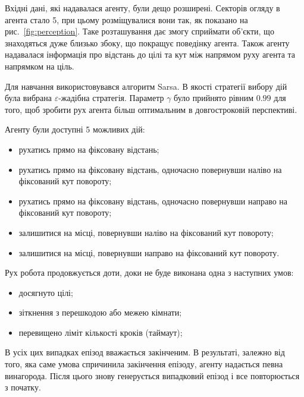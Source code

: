 \documentclass[a4paper,10pt,fleqn]{article}
\begin{document}
Вхідні дані, які надавалася агенту, були дещо розширені. Секторів огляду в агента стало 5, при цьому розміщувалися вони так, як показано на рис.~\ref{fig:perception}. Таке розташування дає змогу сприймати об'єкти, що знаходяться дуже близько збоку, що покращує поведінку агента. Також агенту надавалася інформація про відстань до цілі та кут між напрямом руху агента та напрямком на ціль. 

Для навчання використовувався алгоритм Sarsa. В якості стратегії вибору дій була вибрана $\varepsilon$-жадібна стратегія. Параметр $\gamma$ було прийнято рівним $0.99$ для того, щоб зробити рух агента більш оптимальним в довгостроковій перспективі.

Агенту були доступні 5 можливих дій:
\begin{itemize}
	\item рухатись прямо на фіксовану відстань;
	\item рухатись прямо на фіксовану відстань, одночасно повернувши наліво на фіксований кут повороту;
	\item рухатись прямо на фіксовану відстань, одночасно повернувши направо на фіксований кут повороту;
	\item залишитися на місці, повернувши наліво на фіксований кут повороту;
	\item залишитися на місці, повернувши направо на фіксований кут повороту.
\end{itemize}

Рух робота продовжується доти, доки не буде виконана одна з наступних умов:
\begin{itemize}
	\item досягнуто цілі;
    \item зіткнення з перешкодою або межею кімнати;
	\item перевищено ліміт кількості кроків (таймаут);
\end{itemize}

В усіх цих випадках епізод вважається закінченим. В результаті, залежно від того, яка саме умова спричинила закінчення епізоду, агенту надається певна винагорода. Після цього знову генерується випадковий епізод і все повторюється з початку. 
\end{document}
